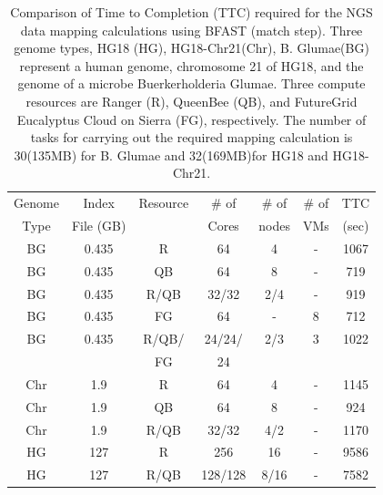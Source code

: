\documentclass{sig-alternate}
\begin{document}
 \begin{table}
\scriptsize
 \begin{tabular}{|c|c|c|c|c|c|c|} 
 \hline 
Genome & Index         & Resource    & \# of & \# of &   \# of         &	TTC  \\
  Type               & File (GB)        & &Cores &   nodes &  VMs&  (sec)\\  
  \hline
 BG &0.435& R&	64 &4&-	&1067 \\
\hline                  
BG &0.435& QB	&	64& 8&-	&719 \\
\hline
 BG &0.435&R/QB	&	32/32 &2/4& -&919 \\
\hline
 BG &0.435& FG &	64 &-&8	&712 \\
\hline
 BG &0.435 &  R/QB/ &	24/24/& 2/3 & 3 &1022\\
 & & FG& 24 &&&\\
\hline
\hline
Chr &1.9& R	&	64& 4 &-&1145 \\
\hline
Chr &1.9& QB	&	64&8&-	&924 \\
\hline
Chr &1.9& R/QB	&	32/32& 4/2&	-&1170 \\
\hline
\hline
HG &127& R	&	256 & 16 &-	&9586\\
\hline
HG &127& R/QB	&	128/128&8/16 & -&7582 \\
\hline
\end{tabular}
\caption{Comparison of Time to Completion (TTC) required for the NGS data mapping calculations using BFAST (match step).  Three genome types, HG18 (HG), HG18-Chr21(Chr), B. Glumae(BG) represent a human genome, chromosome 21 of HG18, and the genome of a microbe Buerkerholderia Glumae.  Three compute resources are Ranger (R), QueenBee (QB), and FutureGrid  Eucalyptus Cloud on Sierra (FG), respectively.  The number of tasks for carrying out the required mapping calculation is 30(135MB) for B. Glumae and 32(169MB)for HG18 and HG18-Chr21.}

  \label{table:NGS-Distributed} 
\end{table}
\end{document}
